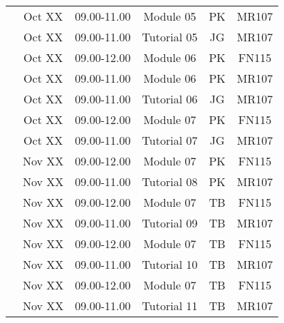 \documentclass[12pts,a4paper,amsmath,amssymb,floatfix]{article}%
\begin{document}
\begin{center}
\begin{tabular}{||c||c|c|c|c|c||}
                                      & Oct XX    & 09.00-11.00 & Module 05   & PK  & MR107 \\
                                      & Oct XX    & 09.00-11.00 & Tutorial 05 & JG  & MR107 \\
\hline
\multirow{3}{*}{\color{red}{Week 12}} & Oct XX    & 09.00-12.00 & Module 06   & PK  & FN115 \\
                                      & Oct XX    & 09.00-11.00 & Module 06   & PK  & MR107 \\
                                      & Oct XX    & 09.00-11.00 & Tutorial 06 & JG  & MR107 \\
\hline
\multirow{3}{*}{\color{red}{Week 13}} & Oct XX    & 09.00-12.00 & Module 07   & PK  & FN115 \\
                                      & Oct XX    & 09.00-11.00 & Tutorial 07 & JG  & MR107 \\
\hline
\multirow{3}{*}{\color{red}{Week 14}} & Nov XX    & 09.00-12.00 & Module 07   & PK  & FN115 \\
                                      & Nov XX    & 09.00-11.00 & Tutorial 08 & PK  & MR107 \\
\hline
\multirow{3}{*}{\color{red}{Week 15}} & Nov XX    & 09.00-12.00 & Module 07   & TB  & FN115 \\
                                      & Nov XX    & 09.00-11.00 & Tutorial 09 & TB  & MR107 \\
\hline
\multirow{3}{*}{\color{red}{Week 16}} & Nov XX    & 09.00-12.00 & Module 07   & TB  & FN115 \\
                                      & Nov XX    & 09.00-11.00 & Tutorial 10 & TB  & MR107 \\
\hline
\multirow{3}{*}{\color{red}{Week 17}} & Nov XX    & 09.00-12.00 & Module 07   & TB  & FN115 \\
                                      & Nov XX    & 09.00-11.00 & Tutorial 11 & TB  & MR107 \\
\hline\hline

\end{tabular}
\end{center}
\end{document}
